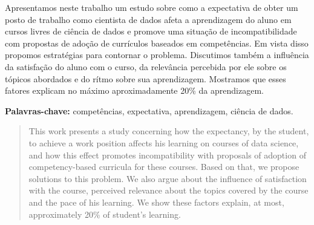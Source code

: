 \begin{resumo}
Apresentamos neste trabalho um estudo sobre como a expectativa de obter um posto de trabalho como cientista de dados afeta a aprendizagem do aluno em cursos livres de ciência de dados e promove uma situação de incompatibilidade com propostas de adoção de currículos baseados em competências.
Em vista disso propomos estratégias para contornar o problema.
Discutimos também a influência da satisfação do aluno com o curso, da relevância percebida por ele sobre os tópicos abordados e do rítmo sobre sua aprendizagem.
Mostramos que esses fatores explicam no máximo aproximadamente 20\% da aprendizagem.
\end{resumo}

\noindent
\textbf{Palavras-chave:} competências, expectativa, aprendizagem, ciência de dados.

\begin{abstract}
This work presents a study concerning how the expectancy, by the student, to achieve a work position affects his learning on courses of data science, and how this effect promotes incompatibility with proposals of adoption of competency-based curricula for these courses.
Based on that, we propose solutions to this problem.
We also argue about the influence of satisfaction with the course, perceived relevance about the topics covered by the course and the pace of his learning.
We show these factors explain, at most, approximately 20\% of student's learning.
\end{abstract}

\noindent
{}
